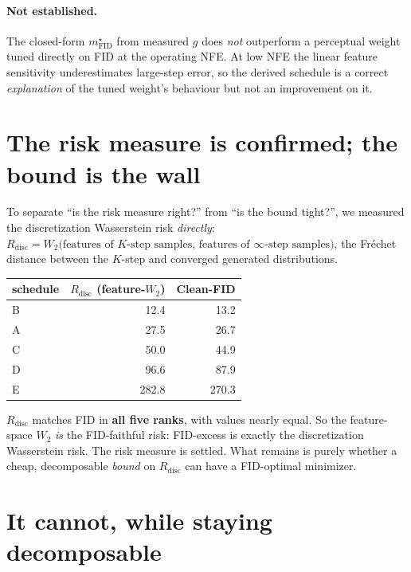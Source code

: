 \documentclass[11pt]{article}
\begin{document}
\paragraph{Not established.} The closed-form $m^{\star}_{\mathrm{FID}}$
from measured $g$ does \emph{not} outperform a perceptual weight tuned
directly on FID at the operating NFE. At low NFE the linear feature
sensitivity underestimates large-step error, so the derived schedule is a
correct \emph{explanation} of the tuned weight's behaviour but not an
improvement on it.

\section{The risk measure is confirmed; the bound is the wall}
\label{sec:Rdisc}

To separate ``is the risk measure right?'' from ``is the bound tight?'',
we measured the discretization Wasserstein risk \emph{directly}:
$R_{\mathrm{disc}}=W_2\bigl(\text{features of }K\text{-step samples},\,
\text{features of }\infty\text{-step samples}\bigr)$, the Fr\'echet
distance between the $K$-step and converged generated distributions.

\begin{center}
\small
\begin{tabular}{l r r}
\toprule
schedule & $R_{\mathrm{disc}}$ (feature-$W_2$) & Clean-FID \\
\midrule
B & 12.4 & 13.2 \\
A & 27.5 & 26.7 \\
C & 50.0 & 44.9 \\
D & 96.6 & 87.9 \\
E & 282.8 & 270.3 \\
\bottomrule
\end{tabular}
\end{center}

\noindent
$R_{\mathrm{disc}}$ matches FID in \textbf{all five ranks}, with values
nearly equal. So the feature-space $W_2$ \emph{is} the FID-faithful risk:
FID-excess is exactly the discretization Wasserstein risk. The risk
measure is settled. What remains is purely whether a cheap, decomposable
\emph{bound} on $R_{\mathrm{disc}}$ can have a FID-optimal minimizer.

\section{It cannot, while staying decomposable}
\label{sec:wall}
\end{document}
